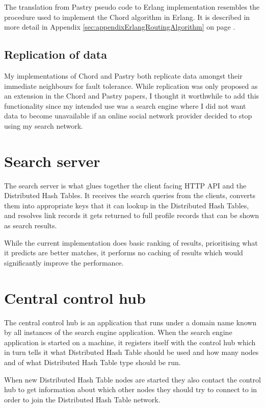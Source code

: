 The translation from Pastry pseudo code to Erlang implementation resembles the procedure used to implement the Chord algorithm in Erlang. It is described in more detail in Appendix \ref{sec:appendixErlangRoutingAlgorithm} on page \pageref{sec:appendixErlangRoutingAlgorithm}.

\subsection{Replication of data}
My implementations of Chord and Pastry both replicate data amongst their immediate neighbours for fault tolerance. While replication was only proposed as an extension in the Chord \cite{chord} and Pastry \cite{pastry} papers, I thought it worthwhile to add this functionality since my intended use was a search engine where I did not want data to become unavailable if an online social network provider decided to stop using my search network.

\section{Search server}
The search server is what glues together the client facing HTTP API and the Distributed Hash Tables. It receives the search queries from the clients, converts them into appropriate keys that it can lookup in the Distributed Hash Tables, and resolves link records it gets returned to full profile records that can be shown as search results.

While the current implementation does basic ranking of results, prioritising what it predicts are better matches, it performs no caching of results which would significantly improve the performance.

\section{Central control hub}
The central control hub is an application that runs under a domain name known by all instances of the search engine application.
When the search engine application is started on a machine, it registers itself with the control hub which in turn tells it what Distributed Hash Table should be used and how many nodes and of what Distributed Hash Table type should be run.

When new Distributed Hash Table nodes are started they also contact the control hub to get information about which other nodes they should try to connect to in order to join the Distributed Hash Table network.

